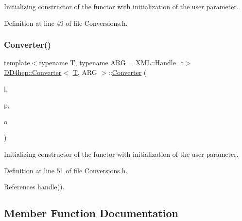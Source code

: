 Initializing constructor of the functor with initialization of the user parameter. 



Definition at line 49 of file Conversions.\+h.

\hypertarget{struct_d_d4hep_1_1_converter_ac18342c9491be390a9329d2ae05b0bb6}{}\label{struct_d_d4hep_1_1_converter_ac18342c9491be390a9329d2ae05b0bb6} 
\subsubsection{\texorpdfstring{Converter()}{Converter()}\hspace{0.1cm}{\footnotesize\ttfamily [3/3]}}
{\footnotesize\ttfamily template$<$typename T, typename A\+RG = X\+M\+L\+::\+Handle\+\_\+t$>$ \\
\hyperlink{struct_d_d4hep_1_1_converter}{D\+D4hep\+::\+Converter}$<$ \hyperlink{class_t}{T}, A\+RG $>$\+::\hyperlink{struct_d_d4hep_1_1_converter}{Converter} (\begin{DoxyParamCaption}\item[{\hyperlink{class_d_d4hep_1_1_geometry_1_1_l_c_d_d}{Geometry\+::\+L\+C\+DD} \&}]{l,  }\item[{\hyperlink{struct_d_d4hep_1_1_converter_a13a876ea9cfcadf85a3dadd32e97a834}{user\+\_\+param}}]{p,  }\item[{\hyperlink{struct_d_d4hep_1_1_converter_a13a876ea9cfcadf85a3dadd32e97a834}{user\+\_\+param}}]{o }\end{DoxyParamCaption})\hspace{0.3cm}{\ttfamily [inline]}}



Initializing constructor of the functor with initialization of the user parameter. 



Definition at line 51 of file Conversions.\+h.



References handle().



\subsection{Member Function Documentation}
\hypertarget{struct_d_d4hep_1_1_converter_a48f7c116ed37009a1c202123ee4bf59a}{}\label{struct_d_d4hep_1_1_converter_a48f7c116ed37009a1c202123ee4bf59a} 
